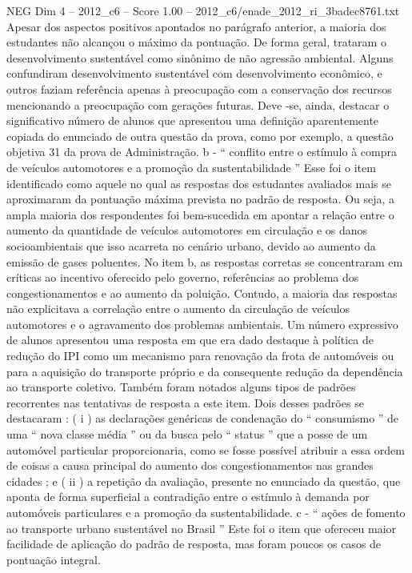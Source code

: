 \begin{textsample}{NEG Dim 4 – 2012\_c6 – Score 1.00 – 2012\_c6/enade\_2012\_ri\_3badec8761.txt}
Apesar dos aspectos positivos apontados no parágrafo anterior, a maioria dos estudantes não alcançou o máximo da pontuação.
De forma geral, trataram o desenvolvimento sustentável como sinônimo de não agressão ambiental.
Alguns confundiram desenvolvimento sustentável com desenvolvimento econômico, e outros faziam referência apenas à preocupação com a conservação dos recursos mencionando a preocupação com gerações futuras.
Deve -se, ainda, destacar o significativo número de alunos que apresentou uma definição aparentemente copiada do enunciado de outra questão da prova, como por exemplo, a questão objetiva 31 da prova de Administração. b - “ conflito entre o estímulo à compra de veículos automotores e a promoção da sustentabilidade ” Esse foi o item identificado como aquele no qual as respostas dos estudantes avaliados mais se aproximaram da pontuação máxima prevista no padrão de resposta.
Ou seja, a ampla maioria dos respondentes foi bem-sucedida em apontar a relação entre o aumento da quantidade de veículos automotores em circulação e os danos socioambientais que isso acarreta no cenário urbano, devido ao aumento da emissão de gases poluentes.
No item b, as respostas corretas se concentraram em críticas ao incentivo oferecido pelo governo, referências ao problema dos congestionamentos e ao aumento da poluição.
Contudo, a maioria das respostas não explicitava a correlação entre o aumento da circulação de veículos automotores e o agravamento dos problemas ambientais.
Um número expressivo de alunos apresentou uma resposta em que era dado destaque à política de redução do IPI como um mecanismo para renovação da frota de automóveis ou para a aquisição do transporte próprio e da consequente redução da dependência ao transporte coletivo.
Também foram notados alguns tipos de padrões recorrentes nas tentativas de resposta a este item.
Dois desses padrões se destacaram : ( i ) as declarações genéricas de condenação do “ consumismo ” de uma “ nova classe média ” ou da busca pelo “ status ” que a posse de um automóvel particular proporcionaria, como se fosse possível atribuir a essa ordem de coisas a causa principal do aumento dos congestionamentos nas grandes cidades ; e ( ii ) a repetição da avaliação, presente no enunciado da questão, que aponta de forma superficial a contradição entre o estímulo à demanda por automóveis particulares e a promoção da sustentabilidade. c - “ ações de fomento ao transporte urbano sustentável no Brasil ” Este foi o item que ofereceu maior facilidade de aplicação do padrão de resposta, mas foram poucos os casos de pontuação integral.

\end{textsample}
